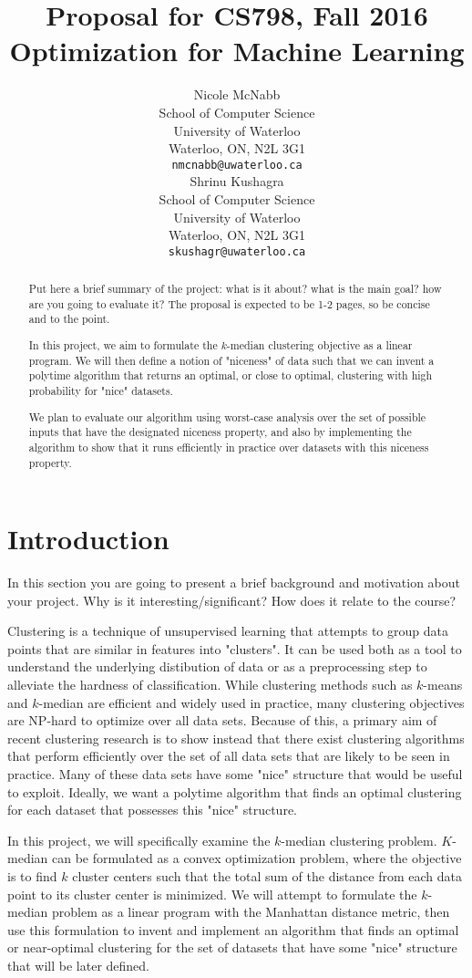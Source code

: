 \documentclass{article}
\title{Proposal for CS798, Fall 2016\\ \large Optimization for Machine Learning}
\author{
	Nicole McNabb \\
	School of Computer Science\\
	University of Waterloo\\
	Waterloo, ON, N2L 3G1 \\
	\texttt{nmcnabb@uwaterloo.ca} \\
	\And
	Shrinu Kushagra\\
	School of Computer Science\\
	University of Waterloo\\
	Waterloo, ON, N2L 3G1 \\
	\texttt{skushagr@uwaterloo.ca} \\	
}
\begin{document}
\maketitle

\begin{abstract} 
Put here a brief summary of the project: what is it about? what is the main goal? how are you going to evaluate it? The proposal is expected to be 1-2 pages, so be concise and to the point.

In this project, we aim to formulate the $k$-median clustering objective as a linear program. We will then define a notion of "niceness" of data such that we can invent a polytime algorithm that returns an optimal, or close to optimal, clustering with high probability for "nice" datasets. 

We plan to evaluate our algorithm using worst-case analysis over the set of possible inputs that have the designated niceness property, and also by implementing the algorithm to show that it runs efficiently in practice over datasets with this niceness property.
\end{abstract} 

\section{Introduction}
In this section you are going to present a brief background and motivation about your project. Why is it interesting/significant? How does it relate to the course?

Clustering is a technique of unsupervised learning that attempts to group data points that are similar in features into "clusters". It can be used both as a tool to understand the underlying distibution of data or as a preprocessing step to alleviate the hardness of classification. While clustering methods such as $k$-means and $k$-median are efficient and widely used in practice, many clustering objectives are NP-hard to optimize over all data sets. Because of this, a primary aim of recent clustering research is to show instead that there exist clustering algorithms that perform efficiently over the set of all data sets that are likely to be seen in practice. Many of these data sets have some "nice" structure that would be useful to exploit. Ideally, we want a polytime algorithm that finds an optimal clustering for each dataset that possesses this "nice" structure.

In this project, we will specifically examine the $k$-median clustering problem. $K$-median can be formulated as a convex optimization problem, where the objective is to find $k$ cluster centers such that the total sum of the distance from each data point to its cluster center is minimized. We will attempt to formulate the $k$-median problem as a linear program with the Manhattan distance metric, then use this formulation to invent and implement an algorithm that finds an optimal or near-optimal clustering for the set of datasets that have some "nice" structure that will be later defined.
\end{document}
